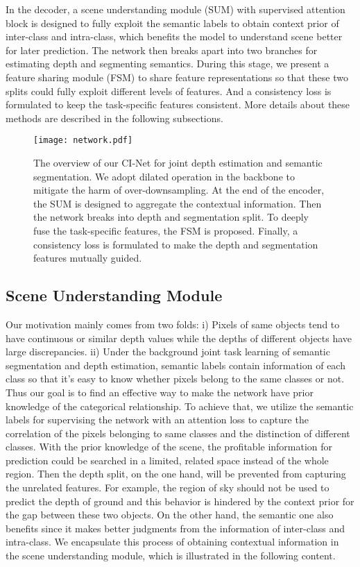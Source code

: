 \documentclass[sn-mathphys]{sn-jnl}
\theoremstyle{thmstyleone}\newtheorem{theorem}{Theorem}\newtheorem{proposition}[theorem]{Proposition}
\theoremstyle{thmstyletwo}\newtheorem{example}{Example}\newtheorem{remark}{Remark}
\theoremstyle{thmstylethree}\newtheorem{definition}{Definition}\usepackage[numbers,sort&compress]{natbib}
\begin{document}
In the decoder, a scene understanding module (SUM) with supervised attention block is designed to fully exploit the semantic labels to obtain context prior of inter-class and intra-class, which benefits the model to understand scene better for later prediction. The network then breaks apart into two branches for estimating depth and segmenting semantics. During this stage, we present a feature sharing module (FSM) to share feature representations so that these two splits could fully exploit different levels of features. And a consistency loss is formulated to keep the task-specific features consistent. More details about these methods are described in the following subsections.


\begin{figure*}[htbp]
	\centering
	\texttt{[image: network.pdf]}
	\caption{The overview of our CI-Net for joint depth estimation and semantic segmentation. We adopt dilated operation in the backbone to mitigate the harm of over-downsampling. At the end of the encoder, the SUM is designed to aggregate the contextual information. Then the network breaks into depth and segmentation split. To deeply fuse the task-specific features, the FSM is proposed. Finally, a consistency loss is formulated to make the depth and segmentation features mutually guided.}
	\label{network architecture}
\end{figure*}

\subsection{Scene Understanding Module}
Our motivation mainly comes from two folds: i) Pixels of same objects tend to have continuous or similar depth values while the depths of different objects have large discrepancies. ii) Under the background joint task learning of semantic segmentation and depth estimation, semantic labels contain information of each class so that it's easy to know whether pixels belong to the same classes or not. Thus our goal is to find an effective way to make the network have prior knowledge of the categorical relationship. To achieve that, we utilize the semantic labels for supervising the network with an attention loss to capture the correlation of the pixels belonging to same classes and the distinction of different classes. With the prior knowledge of the scene, the profitable information for prediction could be searched in a limited, related space instead of the whole region. Then the depth split, on the one hand, will be prevented from capturing the unrelated features. For example, the region of sky should not be used to predict the depth of ground and this behavior is hindered by the context prior for the gap between these two objects. On the other hand, the semantic one also benefits since it makes better judgments from the information of inter-class and intra-class. We encapsulate this process of obtaining contextual information in the scene understanding module, which is illustrated in the following content.
\end{document}
